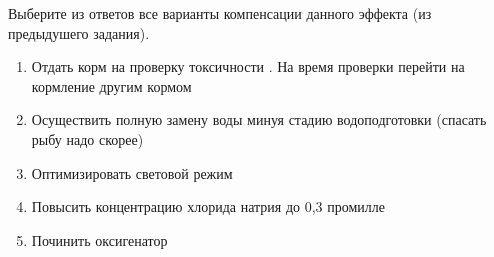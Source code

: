 
Выберите из ответов все варианты компенсации данного эффекта (из предыдушего задания).

\begin{enumerate}
    \item Отдать корм на проверку токсичности . На время проверки перейти на кормление другим кормом
    \item Осуществить полную замену воды минуя стадию водоподготовки (спасать рыбу надо скорее)
    \item Оптимизировать световой режим
    \item Повысить концентрацию хлорида натрия до 0,3 промилле
    \item Починить оксигенатор
\end{enumerate}
